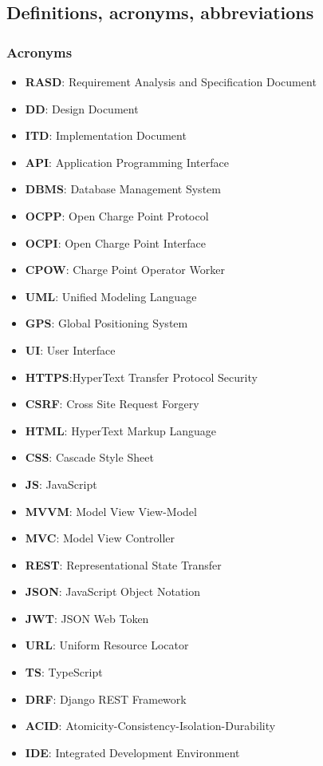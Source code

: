 \documentclass[table, 12pt]{article}
\begin{document}
\subsection{Definitions, acronyms, abbreviations}
\subsubsection*{Acronyms}
\begin{itemize}
    \item \textbf{RASD}: Requirement Analysis and Specification Document
    \item \textbf{DD}: Design Document
    \item \textbf{ITD}: Implementation Document
    \item \textbf{API}: Application Programming Interface
    \item \textbf{DBMS}: Database Management System
    \item \textbf{OCPP}: Open Charge Point Protocol
    \item \textbf{OCPI}: Open Charge Point Interface
    \item \textbf{CPOW}: Charge Point Operator Worker
    \item \textbf{UML}: Unified Modeling Language
    \item \textbf{GPS}: Global Positioning System
    \item \textbf{UI}: User Interface
    \item \textbf{HTTPS}:HyperText Transfer Protocol Security
    \item \textbf{CSRF}: Cross Site Request Forgery
    \item \textbf{HTML}: HyperText Markup Language
    \item \textbf{CSS}: Cascade Style Sheet
    \item \textbf{JS}: JavaScript
    \item \textbf{MVVM}: Model View View-Model
    \item \textbf{MVC}: Model View Controller
    \item \textbf{REST}: Representational State Transfer
    \item \textbf{JSON}: JavaScript Object Notation
    \item \textbf{JWT}: JSON Web Token
    \item \textbf{URL}: Uniform Resource Locator
    \item \textbf{TS}: TypeScript
    \item \textbf{DRF}: Django REST Framework
    \item \textbf{ACID}: Atomicity-Consistency-Isolation-Durability
    \item \textbf{IDE}: Integrated Development Environment
\end{itemize}
\end{document}
